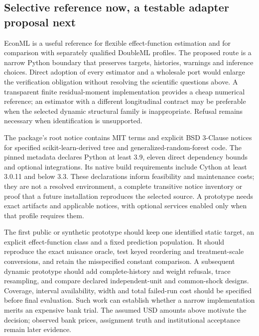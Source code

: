 \subsection{Selective reference now, a testable adapter proposal next}
\label{exec19:econml-route}

EconML is a useful reference for flexible effect-function estimation and for
comparison with separately qualified DoubleML profiles. The proposed route
is a narrow Python boundary that preserves targets, histories, warnings and
inference choices. Direct adoption of every estimator and a wholesale port
would enlarge the verification obligation without resolving the scientific
questions above. A transparent finite residual-moment implementation provides
a cheap numerical reference; an estimator with a different longitudinal
contract may be preferable when the selected dynamic structural family is
inappropriate. Refusal remains necessary when identification is unsupported.

The package's root notice contains MIT terms and explicit BSD 3-Clause notices
for specified scikit-learn-derived tree and generalized-random-forest code.
The pinned metadata declares Python at least 3.9, eleven direct dependency
bounds and optional integrations. Its native build requirements include Cython
at least 3.0.11 and below 3.3. These declarations inform feasibility and
maintenance costs; they are not a resolved environment, a complete transitive
notice inventory or proof that a future installation reproduces the selected
source. A prototype needs exact artifacts and applicable notices, with optional
services enabled only when that profile requires them.
\citep{exec19_econml_source}

The first public or synthetic prototype should keep one identified static
target, an explicit effect-function class and a fixed prediction population.
It should reproduce the exact nuisance oracle, test keyed reordering and
treatment-scale conversions, and retain the misspecified constant comparison.
A subsequent dynamic prototype should add complete-history and weight
refusals, trace resampling, and compare declared independent-unit and
common-shock designs. Coverage, interval availability, width and total
failed-run cost should be specified before final evaluation. Such work can
establish whether a narrow implementation merits an expensive bank trial.
The assumed USD amounts above motivate the decision; observed bank prices,
assignment truth and institutional acceptance remain later evidence.
\citep{exec19_econml_reference}
